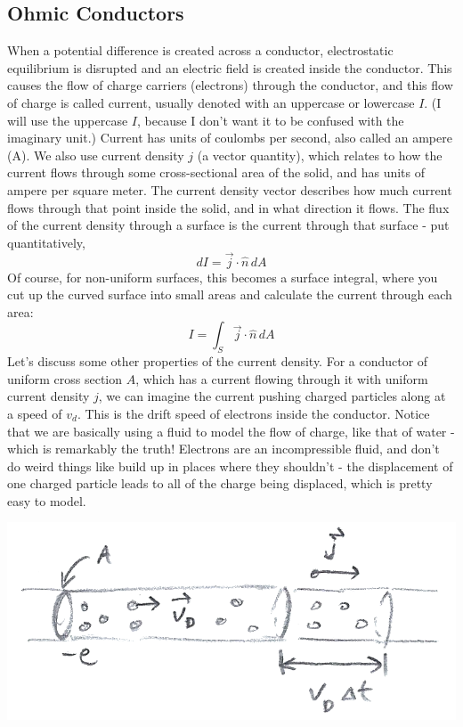 \subsection{Ohmic Conductors}
When a potential difference is created across a conductor, electrostatic equilibrium is disrupted and an electric field is created inside the conductor. This causes the flow of charge carriers (electrons) through the conductor, and this flow of charge is called current, usually denoted with an uppercase or lowercase $I$. (I will use the uppercase $I$, because I don't want it to be confused with the imaginary unit.) Current has units of coulombs per second, also called an ampere (A). We also use current density $j$ (a vector quantity), which relates to how the current flows through some cross-sectional area of the solid, and has units of ampere per square meter. The current density vector describes how much current flows through that point inside the solid, and in what direction it flows. The flux of the current density through a surface is the current through that surface - put quantitatively,
\[
	dI = \vec j \cdot \hat n \, dA
\] 
Of course, for non-uniform surfaces, this becomes a surface integral, where you cut up the curved surface into small areas and calculate the current through each area: 
\[
	I = \int_S \vec j \cdot \hat n \, dA
\]
Let's discuss some other properties of the current density. For a conductor of uniform cross section $A$, which has a current flowing through it with uniform current density $j$, we can imagine the current pushing charged particles along at a speed of $v_d$. This is the drift speed of electrons inside the conductor. Notice that we are basically using a fluid to model the flow of charge, like that of water - which is remarkably the truth! Electrons are an incompressible fluid, and don't do weird things like build up in places where they shouldn't - the displacement of one charged particle leads to all of the charge being displaced, which is pretty easy to model.\\
\begin{center}
	\includegraphics[scale=0.4]{images/em/playdoh.png}\\
\end{center}
